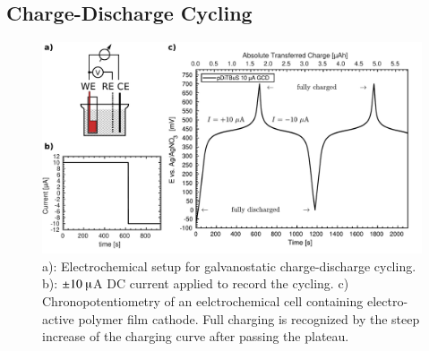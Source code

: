 \subsection{Charge-Discharge Cycling}
\label{sec:echem_charging}
\begin{figure}[h]
\center
	\includegraphics[width=1\textwidth]{./electrochemistry/figures/GCD_principle_pDiTBuS.pdf}
	\caption{a): Electrochemical setup for galvanostatic charge-discharge cycling. b): $\pm10~\muup$A DC current applied to record the cycling. c) Chronopotentiometry of an eelctrochemical cell containing electro-active polymer film cathode. Full charging is recognized by the steep increase of the charging curve after passing the plateau.}
	\label{fig:GCD}
\end{figure}

